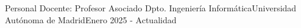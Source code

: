 \begin{cventries}

\cventry{}
{Personal Docente: Profesor Asociado Dpto. Ingeniería Informática}{Universidad Autónoma de Madrid}{Enero 2025 - Actualidad}{}
\end{cventries}